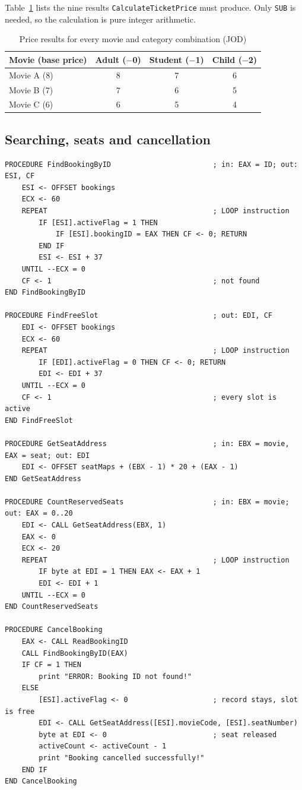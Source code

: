 \documentclass{thesis-library}
\newcommand{\tablefont}{\footnotesize\setstretch{1.15}\hyphenpenalty=10000\relax}
\begin{document}
Table~\ref{tab:prices} lists the nine results \texttt{CalculateTicketPrice} must produce. Only \texttt{SUB} is needed, so the calculation is pure integer arithmetic.

\begin{table}[H]
\centering
\tablefont
\caption{Price results for every movie and category combination (JOD)}
\label{tab:prices}
\begin{tabular}{|l|c|c|c|}
\hline
\textbf{Movie (base price)} & \textbf{Adult ($-$0)} & \textbf{Student ($-$1)} & \textbf{Child ($-$2)} \\
\hline
Movie A (8) & 8 & 7 & 6 \\
\hline
Movie B (7) & 7 & 6 & 5 \\
\hline
Movie C (6) & 6 & 5 & 4 \\
\hline
\end{tabular}
\end{table}

\subsection{Searching, seats and cancellation}

\begin{lstlisting}
PROCEDURE FindBookingByID                        ; in: EAX = ID; out: ESI, CF
    ESI <- OFFSET bookings
    ECX <- 60
    REPEAT                                       ; LOOP instruction
        IF [ESI].activeFlag = 1 THEN
            IF [ESI].bookingID = EAX THEN CF <- 0; RETURN
        END IF
        ESI <- ESI + 37
    UNTIL --ECX = 0
    CF <- 1                                      ; not found
END FindBookingByID

PROCEDURE FindFreeSlot                           ; out: EDI, CF
    EDI <- OFFSET bookings
    ECX <- 60
    REPEAT                                       ; LOOP instruction
        IF [EDI].activeFlag = 0 THEN CF <- 0; RETURN
        EDI <- EDI + 37
    UNTIL --ECX = 0
    CF <- 1                                      ; every slot is active
END FindFreeSlot

PROCEDURE GetSeatAddress                         ; in: EBX = movie, EAX = seat; out: EDI
    EDI <- OFFSET seatMaps + (EBX - 1) * 20 + (EAX - 1)
END GetSeatAddress

PROCEDURE CountReservedSeats                     ; in: EBX = movie; out: EAX = 0..20
    EDI <- CALL GetSeatAddress(EBX, 1)
    EAX <- 0
    ECX <- 20
    REPEAT                                       ; LOOP instruction
        IF byte at EDI = 1 THEN EAX <- EAX + 1
        EDI <- EDI + 1
    UNTIL --ECX = 0
END CountReservedSeats

PROCEDURE CancelBooking
    EAX <- CALL ReadBookingID
    CALL FindBookingByID(EAX)
    IF CF = 1 THEN
        print "ERROR: Booking ID not found!"
    ELSE
        [ESI].activeFlag <- 0                    ; record stays, slot is free
        EDI <- CALL GetSeatAddress([ESI].movieCode, [ESI].seatNumber)
        byte at EDI <- 0                         ; seat released
        activeCount <- activeCount - 1
        print "Booking cancelled successfully!"
    END IF
END CancelBooking
\end{lstlisting}
\end{document}
